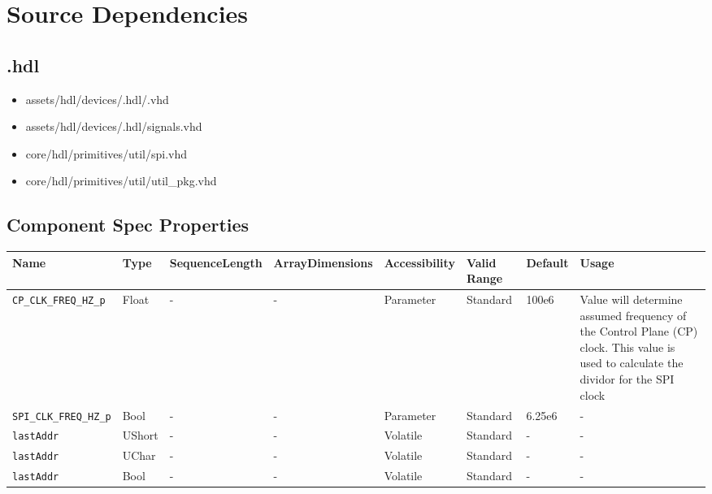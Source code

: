 \section*{Source Dependencies}
\subsection*{\comp.hdl}
\begin{itemize}
	\item assets/hdl/devices/\comp{}.hdl/\comp.vhd
	\item assets/hdl/devices/\comp{}.hdl/signals.vhd
	\item core/hdl/primitives/util/spi.vhd
	\item core/hdl/primitives/util/util\_pkg.vhd
\end{itemize}
\begin{landscape}

	\section*{Component Spec Properties}
	\begin{scriptsize}
		\begin{tabular}{|p{3.75cm}|p{1.25cm}|p{2cm}|p{2.75cm}|p{1.5cm}|p{1.5cm}|p{1cm}|p{5.25cm}|}
			\hline
			\rowcolor{blue}
			Name               & Type & SequenceLength & ArrayDimensions & Accessibility      & Valid Range & Default & Usage                                                                               \\
			\hline
			\verb+CP_CLK_FREQ_HZ_p+ & Float & -              & -               & Parameter  & Standard    & 100e6   & Value will determine assumed frequency of the Control Plane (CP) clock. This value is used to calculate the dividor for the SPI clock              \\
			\hline
			\verb+SPI_CLK_FREQ_HZ_p+ & Bool & -              & -               & Parameter & Standard    & 6.25e6  & - \\
			\hline
			\verb+lastAddr+ & UShort & -              & -               & Volatile & Standard    & - & - \\
			\hline
			\verb+lastAddr+ & UChar & -              & -               & Volatile & Standard    & - & - \\
			\hline
			\verb+lastAddr+ & Bool & -              & -               & Volatile & Standard    & - & - \\
			\hline
		\end{tabular}
	\end{scriptsize}


\end{landscape}
